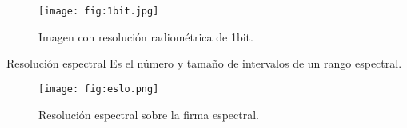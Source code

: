 
\begin{frame}{}
  \begin{figure}
    \centering
    \texttt{[image: fig:1bit.jpg]}
    \caption{Imagen con resolución radiométrica de 1bit.}
    \label{}
  \end{figure}
\end{frame}



\begin{frame}{}
    \begin{block}{Resolución espectral}
        Es el número y tamaño de intervalos de un rango espectral.
    \end{block}
\end{frame}

\begin{frame}{}
  \begin{figure}
    \centering
    \texttt{[image: fig:eslo.png]}
    \caption{Resolución espectral sobre la firma espectral.}
    \label{}
  \end{figure}
\end{frame}











\gracias
